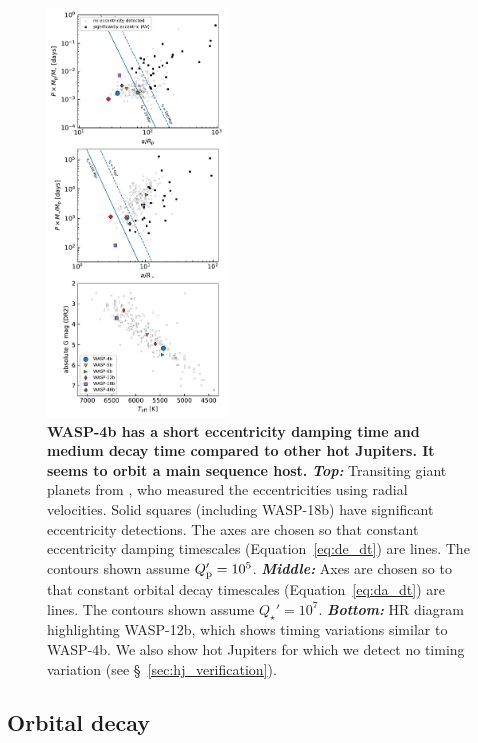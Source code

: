 \documentclass[12pt,twocolumn,tighten]{aastex62}
\begin{document}
\begin{figure}[t!]
  \begin{center}
    \includegraphics[width=0.425\textwidth]{f4.pdf}
  \end{center}
  \vspace{-0.5cm}
  \caption{
    {\bf WASP-4b has a short eccentricity
    	damping time and medium decay time compared to other hot Jupiters.
    	It seems to orbit a main sequence host.
    }
    {\bf \it Top:}
    Transiting giant planets from \citet{bonomo_gaps_2017}, who
    measured the eccentricities using radial velocities.  Solid
    squares (including WASP-18b) have significant eccentricity
    detections.  The axes are chosen so that constant eccentricity
    damping timescales (Equation~\ref{eq:de_dt}) are lines.  The
    contours shown assume $Q_{\rm p}' = 10^5$.
    {\bf \it Middle:} 
    Axes are chosen so to that constant orbital decay timescales
    (Equation~\ref{eq:da_dt}) are lines.  The contours shown assume
    $Q_\star' = 10^7$.
    {\bf \it Bottom:}
    HR diagram highlighting WASP-12b, which shows timing variations
    similar to WASP-4b.  We also show hot Jupiters for which we
    detect no timing variation (see \S~\ref{sec:hj_verification}).
    \label{fig:context}
  }
\end{figure}

 
\subsection{Orbital decay}
\end{document}
